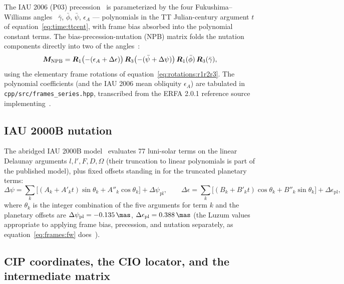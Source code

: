 The IAU 2006 (P03) precession~\cite{capitaine2003} is parameterized by the
four Fukushima--Williams angles~\cite{fukushima2003, wallace2006}
$\bar\gamma$, $\bar\phi$, $\bar\psi$, $\epsilon_A$ --- polynomials in the
TT Julian-century argument $t$ of equation~\eqref{eq:time:ttcent}, with
frame bias absorbed into the polynomial constant terms. The
bias-precession-nutation (NPB) matrix folds the nutation components
directly into two of the angles~\cite{wallace2006}:
\begin{equation}
  \bm{M}_{\mathrm{NPB}} =
  \bm{R}_1\bigl(-(\epsilon_A + \Delta\epsilon)\bigr)\,
  \bm{R}_3\bigl(-(\bar\psi + \Delta\psi)\bigr)\,
  \bm{R}_1(\bar\phi)\,
  \bm{R}_3(\bar\gamma),
  \label{eq:frames:fw}
\end{equation}
using the elementary frame rotations of
equation~\eqref{eq:rotations:r1r2r3}. The polynomial coefficients (and the
IAU 2006 mean obliquity $\epsilon_A$) are tabulated in
\texttt{cpp/src/frames\_series.hpp}, transcribed from the ERFA 2.0.1
reference source~\cite{erfa201} implementing~\cite{capitaine2003,
wallace2006}.

\subsection{IAU 2000B nutation}

The abridged IAU 2000B model~\cite{mccarthy2003} evaluates 77 luni-solar
terms on the linear Delaunay arguments $l, l', F, D, \Omega$ (their
truncation to linear polynomials is part of the published model), plus
fixed offsets standing in for the truncated planetary terms:
\begin{equation}
  \Delta\psi = \sum_{k} \bigl[(A_k + A'_k t)\sin\theta_k
    + A''_k \cos\theta_k\bigr] + \Delta\psi_{\mathrm{pl}},
  \qquad
  \Delta\epsilon = \sum_{k} \bigl[(B_k + B'_k t)\cos\theta_k
    + B''_k \sin\theta_k\bigr] + \Delta\epsilon_{\mathrm{pl}},
  \label{eq:frames:nut00b}
\end{equation}
where $\theta_k$ is the integer combination of the five arguments for term
$k$ and the planetary offsets are $\Delta\psi_{\mathrm{pl}} =
\qty{-0.135}{\mas}$, $\Delta\epsilon_{\mathrm{pl}} = \qty{0.388}{\mas}$
(the Luzum values appropriate to applying frame bias, precession, and
nutation separately, as equation~\eqref{eq:frames:fw}
does~\cite{mccarthy2003, erfa201}).

\subsection{CIP coordinates, the CIO locator, and the intermediate matrix}

